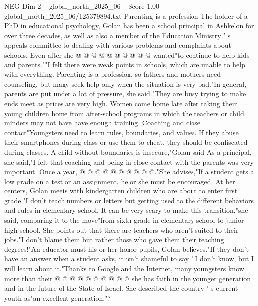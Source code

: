 \begin{textsample}{NEG Dim 2 – global\_north\_2025\_06 – Score 1.00 – global\_north\_2025\_06/125379894.txt}
Parenting is a profession The holder of a PhD in educational psychology, Golan has been a school principal in Ashkelon for over three decades, as well as also a member of the Education Ministry ' s appeals committee to dealing with various problems and complaints about schools.
Even after she @ @ @ @ @ @ @ @ @ @ wanted"to continue to help kids and parents.""I felt there were weak points in schools, which are unable to help with everything.
Parenting is a profession, so fathers and mothers need counseling, but many seek help only when the situation is very bad."In general, parents are put under a lot of pressure, she said."They are busy trying to make ends meet as prices are very high.
Women come home late after taking their young children home from after-school programs in which the teachers or child minders may not have have enough training.
Coaching and close contact"Youngsters need to learn rules, boundaries, and values.
If they abuse their smartphones during class or use them to cheat, they should be confiscated during classes.
A child without boundaries is insecure,"Golan said As a principal, she said,"I felt that coaching and being in close contact with the parents was very important.
Once a year, @ @ @ @ @ @ @ @ @ @."She advises,"If a student gets a low grade on a test or an assignment, he or she must be encouraged.
At her centers, Golan meets with kindergarten children who are about to enter first grade."I don't teach numbers or letters but getting used to the different behaviors and rules in elementary school.
It can be very scary to make this transition,"she said, comparing it to the move"from sixth grade in elementary school to junior high school.
She points out that there are teachers who aren't suited to their jobs."I don't blame them but rather those who gave them their teaching degrees!"An educator must his or her honor pupils, Golan believes."If they don't have an answer when a student asks, it isn't shameful to say ' I don't know, but I will learn about it."Thanks to Google and the Internet, many youngsters know more than their @ @ @ @ @ @ @ @ @ @ she has faith in the younger generation and in the future of the State of Israel.
She described the country ' s current youth as"an excellent generation."?

\end{textsample}
